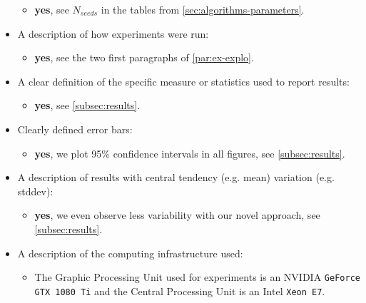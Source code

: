\begin{itemize}
        \begin{itemize}
            \item \textbf{yes}, see $N_{seeds}$ in the tables from \autoref{sec:algorithms-parameters}.
        \end{itemize}

    \item A description of how experiments were run:              \begin{itemize}
            \item \textbf{yes}, see the two first paragraphs of \autoref{par:ex-explo}.
        \end{itemize}

    \item A clear definition of the specific measure or statistics used to report results:
        \begin{itemize}
            \item  \textbf{yes}, see \autoref{subsec:results}.
        \end{itemize}

    \item Clearly defined error bars:
    
        \begin{itemize}
            \item  \textbf{yes}, we plot 95\% confidence intervals in all figures, see \autoref{subsec:results}.
        \end{itemize}

    \item A description of results with central tendency (e.g. mean)  variation (e.g. stddev):
    
        \begin{itemize}
            \item  \textbf{yes}, we even observe less variability with our novel approach, see \autoref{subsec:results}.
        \end{itemize}
    \item A description of the computing infrastructure used:     \begin{itemize}
            \item The Graphic Processing Unit used for experiments is an NVIDIA \texttt{GeForce GTX 1080 Ti} and the Central Processing Unit is an Intel \texttt{Xeon E7}.
        \end{itemize}
\end{itemize}